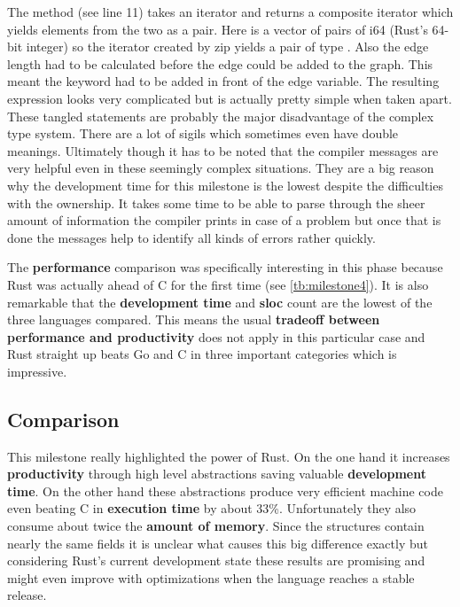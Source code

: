 The  method (see line 11) takes an iterator and returns a composite iterator which yields elements from the two as a pair. Here  is a vector of pairs of i64 (Rust's 64-bit integer) so the iterator created by zip yields a pair of type . Also the edge length had to be calculated before the edge could be added to the graph. This meant the  keyword had to be added in front of the edge variable. The resulting expression  looks very complicated but is actually pretty simple when taken apart. These tangled statements are probably the major disadvantage of the complex type system. There are a lot of sigils which sometimes even have double meanings. Ultimately though it has to be noted that the compiler messages are very helpful even in these seemingly complex situations. They are a big reason why the development time for this milestone is the lowest despite the difficulties with the ownership. It takes some time to be able to parse through the sheer amount of information the compiler prints in case of a problem but once that is done the messages help to identify all kinds of errors rather quickly.

The \textbf{performance} comparison was specifically interesting in this phase because Rust was actually ahead of C for the first time (see \autoref{tb:milestone4}). It is also remarkable that the \textbf{development time} and \textbf{\gls{sloc}} count are the lowest of the three languages compared. This means the usual \textbf{tradeoff between performance and productivity} does not apply in this particular case and Rust straight up beats Go and C in three important categories which is impressive.

\subsection{Comparison}
\label{subsec:Implementation::SequentialBenchmark::Comparison}

This milestone really highlighted the power of Rust. On the one hand it increases \textbf{productivity} through high level abstractions saving valuable \textbf{development time}. On the other hand these abstractions produce very efficient machine code even beating C in \textbf{execution time} by about 33\%. Unfortunately they also consume about twice the \textbf{amount of memory}. Since the structures contain nearly the same fields it is unclear what causes this big difference exactly but considering Rust's current development state these results are promising and might even improve with optimizations when the language reaches a stable release.

